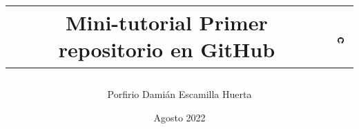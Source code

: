 

\title{
	\begin{tabular}{cc}
		Mini-tutorial Primer repositorio en GitHub & 
		\includegraphics[width=15px]{GitHub-Mark-120px-plus.png}
	\end{tabular}
}
\author{Porfirio Damián Escamilla Huerta}
\date{Agosto 2022}

\lstset{style=bashStyle}


	
	\maketitle
	\newpage
	
	
	
	
	
	
	
	

